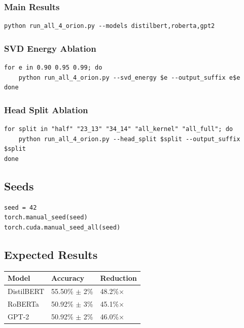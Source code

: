 \subsubsection{Main Results}

\begin{lstlisting}
python run_all_4_orion.py --models distilbert,roberta,gpt2
\end{lstlisting}

\subsubsection{SVD Energy Ablation}

\begin{lstlisting}
for e in 0.90 0.95 0.99; do
    python run_all_4_orion.py --svd_energy $e --output_suffix e$e
done
\end{lstlisting}

\subsubsection{Head Split Ablation}

\begin{lstlisting}
for split in "half" "23_13" "34_14" "all_kernel" "all_full"; do
    python run_all_4_orion.py --head_split $split --output_suffix $split
done
\end{lstlisting}

\subsection{Seeds}

\begin{lstlisting}
seed = 42
torch.manual_seed(seed)
torch.cuda.manual_seed_all(seed)
\end{lstlisting}

\subsection{Expected Results}

\begin{table}[H]
\centering
\small
\begin{tabular}{lll}
\toprule
\textbf{Model} & \textbf{Accuracy} & \textbf{Reduction} \\
\midrule
DistilBERT & 55.50\% $\pm$ 2\% & 48.2\%$\times$ \\
RoBERTa & 50.92\% $\pm$ 3\% & 45.1\%$\times$ \\
GPT-2 & 50.92\% $\pm$ 2\% & 46.0\%$\times$ \\
\bottomrule
\end{tabular}
\end{table}

